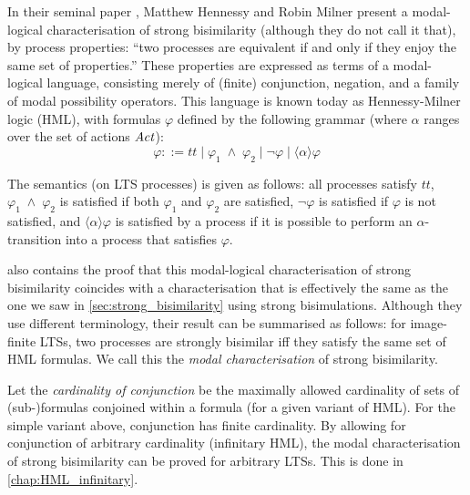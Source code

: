 %
\begin{isabellebody}%
%
%
\isadelimtheory
%
\endisadelimtheory
%
\isatagtheory
%
\endisatagtheory
{\isafoldtheory}%
%
\isadelimtheory
%
\endisadelimtheory
%
\isadelimdocument
%
\endisadelimdocument
%
\isatagdocument
%
\isamarkuptrue%
%
\endisatagdocument
{\isafolddocument}%
%
\isadelimdocument
%
\endisadelimdocument
%
\begin{isamarkuptext}%
\label{sec:HML}%
\end{isamarkuptext}\isamarkuptrue%
%
\begin{isamarkuptext}%
In their seminal paper \cite{hm85}, Matthew Hennessy and Robin Milner present a modal-logical characterisation of strong bisimilarity (although they do not call it that), by process properties: \enquote{two processes are equivalent if and only if they enjoy the same set of properties.} These properties are expressed as terms of a modal-logical language, consisting merely of (finite) conjunction, negation, and a family of modal possibility operators. This language is known today as Hennessy-Milner logic (HML), with formulas $\varphi$ defined by the following grammar (where $\alpha$ ranges over the set of actions $\mathit{Act}$):
$$\varphi ::= t\!t \mid \varphi_1 \;\wedge\; \varphi_2 \mid \neg\varphi \mid \langle\alpha\rangle\varphi$$

The semantics (on LTS processes) is given as follows: all processes satisfy $t\!t$, $\varphi_1 \;\wedge\; \varphi_2$ is satisfied if both $\varphi_1$ and $\varphi_2$ are satisfied, $\neg\varphi$ is satisfied if $\varphi$ is not satisfied, and $\langle\alpha\rangle\varphi$ is satisfied by a process if it is possible to perform an $\alpha$-transition into a process that satisfies $\varphi$.

\cite{hm85} also contains the proof that this modal-logical characterisation of strong bisimilarity coincides with a characterisation that is effectively the same as the one we saw in \cref{sec:strong_bisimilarity} using strong bisimulations. Although they use different terminology, their result can be summarised as follows: for image-finite LTSs, two processes are strongly bisimilar iff they satisfy the same set of HML formulas. We call this the \emph{modal characterisation} of strong bisimilarity.

Let the \emph{cardinality of conjunction} be the maximally allowed cardinality of sets of (sub-)formulas conjoined within a formula (for a given variant of HML). For the simple variant above, conjunction has finite cardinality. By allowing for conjunction of arbitrary cardinality (infinitary HML), the modal characterisation of strong bisimilarity can be proved for arbitrary LTSs. This is done in \cref{chap:HML_infinitary}.


\end{isamarkuptext}
\end{isabellebody}
